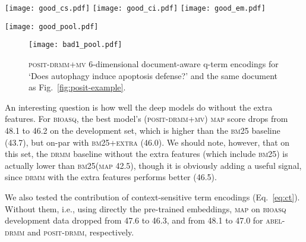 \documentclass[11pt,a4paper]{article}
\newcommand{\bioasq}{\textsc{bioasq}\xspace}
\newcommand{\drmm}{\textsc{drmm}\xspace}
\newcommand{\abeldrmm}{\textsc{abel-drmm}\xspace}
\newcommand{\positdrmm}{\textsc{posit-drmm}\xspace}
\newcommand{\positdrmmmv}{\textsc{posit-drmm+mv}\xspace}
\newcommand{\bmtf}{\textsc{bm25}\xspace}
\newcommand{\map}{\textsc{map}\xspace}
\begin{document}
\begin{figure*}[th]
\begin{minipage}{4.1in}
\texttt{[image: good\_cs.pdf]}
\texttt{[image: good\_ci.pdf]}
\texttt{[image: good\_em.pdf]}
\end{minipage}
\begin{minipage}{2in}
\texttt{[image: good\_pool.pdf]}
\vspace{0.1in}
\end{minipage}
\vspace{-0.1in}
\caption{Left: Cosine similarities (\positdrmm attention) of query and document terms, with context-sensitive, context-insensitive, and exact match views of the terms (top to bottom). Document truncated to 50 words. White is stronger. Right: Corresponding \positdrmmmv 6-dimensional document-aware query term encodings.}
\label{fig:posit-example}
\vspace{-0.1in}
\end{figure*}

\begin{figure}[t]
\begin{center}
\texttt{[image: bad1\_pool.pdf]}
\end{center}
\vspace{-0.2in}
\caption{\positdrmmmv 6-dimensional document-aware q-term encodings for  `Does autophagy induce apoptosis defense?' and the same document as Fig.~\ref{fig:posit-example}.}
\label{fig:posit-bad-example}
\vspace{-0.2in}
\end{figure}

An interesting question is how well the deep models do without the extra features. For \bioasq, the best model's (\positdrmmmv) \map score drops from 48.1 to 46.2 on the development set, which is higher than the \bmtf baseline (43.7), but on-par with \textsc{bm25+extra} (46.0).
We should note, however, that on this set, the \drmm baseline without the extra features (which include \bmtf) is actually lower than \bmtf (\map 42.5), though it is obviously adding a useful signal, since \drmm with the extra features performs better (46.5).

We also tested the contribution of context-sensitive term encodings (Eq.~\ref{eq:ct}). Without them, i.e., using directly the pre-trained embeddings, \map on \bioasq development data dropped from 47.6 to 46.3, and from 48.1 to 47.0 for \abeldrmm and \positdrmm, respectively.
\end{document}
